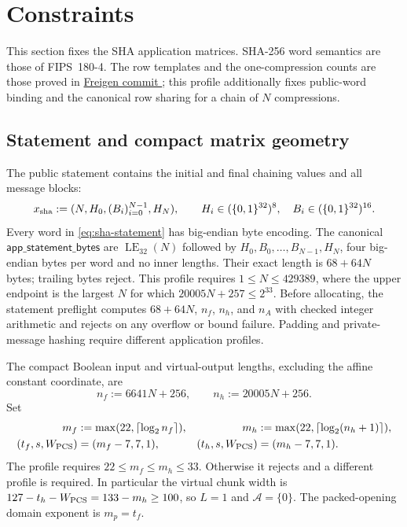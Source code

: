 \section{Constraints}

This section fixes the SHA application matrices.  SHA-256 word semantics are
those of FIPS~180-4.  The row templates and the one-compression counts are
those proved in
\href{https://github.com/reilabs/freigen/commit/93d3c55d69b4e7747eacf24212f93c795d05fdba}
{Freigen commit }; this profile additionally fixes public-word
binding and the canonical row sharing for a chain of $N$ compressions.

\subsection{Statement and compact matrix geometry}

The public statement contains the initial and final chaining values and all
message blocks:
\begin{equation}
 x_{\rm sha}:=(N,H_0,(B_i)_{i=0}^{N-1},H_N),\qquad
 H_i\in(\{0,1\}^{32})^8,\quad B_i\in(\{0,1\}^{32})^{16}.
 \label{eq:sha-statement}
\end{equation}
Every word in \cref{eq:sha-statement} has big-endian byte encoding.  The
canonical $\mathsf{app\_statement\_bytes}$ are $\operatorname{LE}_{32}(N)$
followed by $H_0,B_0,\ldots,B_{N-1},H_N$, four big-endian bytes per word and
no inner lengths.  Their exact length is $68+64N$ bytes; trailing bytes reject.
This profile requires
$1\le N\le429389$, where the upper endpoint is the largest $N$ for which
$20005N+257\le2^{33}$.  Before allocating, the statement preflight computes
$68+64N$, $n_f$, $n_h$, and $n_A$ with checked integer arithmetic and rejects
on any overflow or bound failure.  Padding and private-message hashing require
different application profiles.

The compact Boolean input and virtual-output lengths, excluding the affine
constant coordinate, are
\begin{equation}
 n_f:=6641N+256,\qquad n_h:=20005N+256.
 \label{eq:sha-live-lengths}
\end{equation}
Set
\begin{equation}
 \begin{aligned}
 m_f&:=\max(22,\lceil\log_2n_f\rceil),&
 m_h&:=\max(22,\lceil\log_2(n_h+1)\rceil),\\
 (t_f,s,W_{\rm PCS})&=(m_f-7,7,1),&
 (t_h,s,W_{\rm PCS})&=(m_h-7,7,1).
 \end{aligned}
 \label{eq:sha-shapes}
\end{equation}
The profile requires $22\le m_f\le m_h\le33$.  Otherwise it rejects and a
different profile is required.  In particular the virtual chunk width is
$127-t_h-W_{\rm PCS}=133-m_h\ge100$, so $L=1$ and
$\mathcal A=\{0\}$.  The packed-opening domain exponent is $m_p=t_f$.

